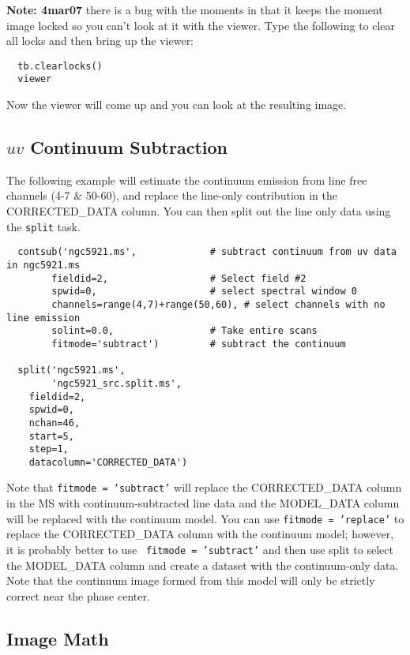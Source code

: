 {\bf Note: 4mar07} there is a bug with the moments in that it keeps
the moment image locked so you can't look at it with the viewer.
Type the following to clear all locks and then bring up the viewer: 
\small
\begin{verbatim}
  tb.clearlocks()
  viewer
\end{verbatim}
\normalsize
Now the viewer will come up and you can look at the resulting image.  


\subsection{$uv$ Continuum Subtraction}
\label{subsection:image.cont.sub}

The following example will estimate the continuum emission from line
free channels (4-7 \& 50-60), and replace the line-only
contribution in the CORRECTED\_DATA column.  You can then split out
the line only data using the {\tt split} task.  

\small
\begin{verbatim}
  contsub('ngc5921.ms',             # subtract continuum from uv data in ngc5921.ms
        fieldid=2,                  # Select field #2
        spwid=0,                    # select spectral window 0
        channels=range(4,7)+range(50,60), # select channels with no line emission
        solint=0.0,                 # Take entire scans
        fitmode='subtract')         # subtract the continuum 

  split('ngc5921.ms', 
        'ngc5921_src.split.ms',
	fieldid=2,
	spwid=0,
	nchan=46,
	start=5,
	step=1,
	datacolumn='CORRECTED_DATA')
\end{verbatim}
\normalsize

Note that {\tt fitmode = 'subtract'} will replace the CORRECTED\_DATA
column in the MS with continuum-subtracted line data and the
MODEL\_DATA column will be replaced with the continuum model.  You can
use {\tt fitmode = 'replace'} to replace the CORRECTED\_DATA column
with the continuum model; however, it is probably better to use {\tt
fitmode = 'subtract'} and then use split to select the MODEL\_DATA
column and create a dataset with the continuum-only data.  Note that
the continuum image formed from this model will only be strictly
correct near the phase center.

\subsection{Image Math}
\label{subsection:image.math}

